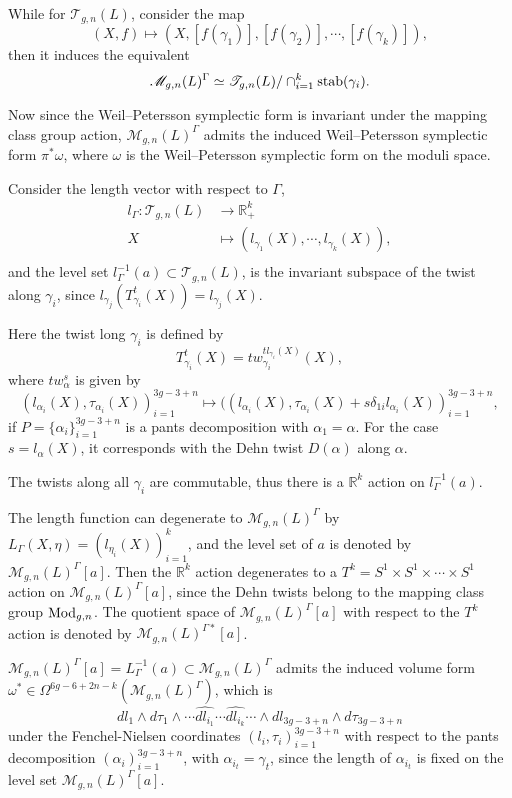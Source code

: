  While for $\mathscr{T}_{g,n}(L)$, consider the map $$
 (X,f)\mapsto (X,[f(\gamma_1)],[f(\gamma_2)],\cdots,[f(\gamma_k)]),
 $$
 then it induces the equivalent $$
 \mathscr{M}_{g,n}(L)^\Gamma\simeq \mathscr{T}_{g,n}(L)/\cap_{i=1}^k \operatorname{stab}(\gamma_i).
 $$
 
 Now since the Weil--Petersson symplectic form is invariant under the mapping class group action,  $\mathscr{M}_{g,n}(L)^\Gamma$ admits the induced Weil--Petersson symplectic form $\pi^*\omega$, where $\omega$ is the Weil--Petersson symplectic form on the moduli space.
 
Consider the length vector with respect to  $\Gamma$, 
$$
\begin{aligned}
    l_\Gamma\colon\mathscr{T}_{g,n}(L)&\to \mathbb{R}_+^k\\
    X &\mapsto (l_{\gamma_1}(X),\cdots,l_{\gamma_k}(X)),\\
\end{aligned}
$$ 
and the level set $l_\Gamma^{-1}(a)\subset \mathscr{T}_{g,n}(L)$, 
is the invariant subspace of  the twist along $\gamma_i$, since $l_{\gamma_j}(T_{\gamma_i}^t(X))=l_{\gamma_j}(X)$.


Here the twist long $\gamma_i$ is defined by $$
T_{\gamma_i}^t(X)=tw_{\gamma_i}^{tl_{\gamma_i}(X)}(X),
$$
where $tw_{\alpha}^s$ is given by $$
(l_{\alpha_i}(X),\tau_{\alpha_i}(X))_{i=1}^{3g-3+n}\mapsto ((l_{\alpha_i}(X),\tau_{\alpha_i}(X)+s\delta_{1i}l_{\alpha_i}(X))_{i=1}^{3g-3+n},
$$
 if $P=\{\alpha_i\}_{i=1}^{3g-3+n}$ is a pants decomposition with $\alpha_1=\alpha$. For the case $s=l_{\alpha}(X)$, it corresponds with the Dehn  twist  $D(\alpha)$ along $\alpha$.
 
 The twists along  all $\gamma_i$  are commutable,  thus there is a $\mathbb{R}^k$ action on $l_\Gamma^{-1}(a)$. 
 
 The length function can degenerate to $\mathscr{M}_{g,n}(L)^\Gamma$ by 
 $L_{\Gamma}(X,\eta)=(l_{\eta_i}(X))_{i=1}^k$,
  and the level set of $a$ is  denoted by $\mathscr{M}_{g,n}(L)^\Gamma[a]$. Then the $\mathbb{R}^k$ action degenerates to a $T^k=S^1\times S^1\times \cdots\times S^1$ action on $\mathscr{M}_{g,n}(L)^\Gamma[a]$, since the Dehn twists belong to the mapping class group $\operatorname{Mod}_{g,n}$. The quotient space of $\mathscr{M}_{g,n}(L)^\Gamma[a]$ with respect to the $T^k$ action is denoted by $\mathscr{M}_{g,n}(L)^{\Gamma*}[a]$.
  
  $\mathscr{M}_{g,n}(L)^{\Gamma}[a]=L_{\Gamma}^{-1}(a)\subset \mathscr{M}_{g,n}(L)^{\Gamma}$ admits the induced volume form $\omega^*\in\Omega^{6g-6+2n-k}(\mathscr{M}_{g,n}(L)^{\Gamma})$,  which is
  $$
    dl_1\wedge d\tau_1\wedge \cdots \widehat{dl_{i_1}}\cdots \widehat{dl_{i_k}}\cdots\wedge dl_{3g-3+n}\wedge d\tau_{3g-3+n}
  $$
  under the Fenchel-Nielsen coordinates $(l_i,\tau_i)_{i=1}^{3g-3+n}$ with respect to the pants decomposition $(\alpha_i)_{i=1}^{3g-3+n}$, with $\alpha_{i_t}=\gamma_t$, since the length of $\alpha_{i_t}$ is fixed on the level set $\mathscr{M}_{g,n}(L)^{\Gamma}[a]$.
  
